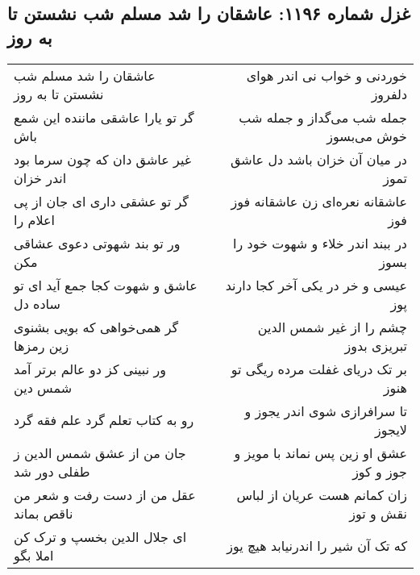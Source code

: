\begin{center}
\section*{غزل شماره ۱۱۹۶: عاشقان را شد مسلم شب نشستن تا به روز}
\label{sec:1196}
\begin{longtable}{l p{0.5cm} r}
عاشقان را شد مسلم شب نشستن تا به روز
&&
خوردنی و خواب نی اندر هوای دلفروز
\\
گر تو یارا عاشقی ماننده این شمع باش
&&
جمله شب می‌گداز و جمله شب خوش می‌بسوز
\\
غیر عاشق دان که چون سرما بود اندر خزان
&&
در میان آن خزان باشد دل عاشق تموز
\\
گر تو عشقی داری ای جان از پی اعلام را
&&
عاشقانه نعره‌ای زن عاشقانه فوز فوز
\\
ور تو بند شهوتی دعوی عشاقی مکن
&&
در ببند اندر خلاء و شهوت خود را بسوز
\\
عاشق و شهوت کجا جمع آید ای تو ساده دل
&&
عیسی و خر در یکی آخر کجا دارند پوز
\\
گر همی‌خواهی که بویی بشنوی زین رمزها
&&
چشم را از غیر شمس الدین تبریزی بدوز
\\
ور نبینی کز دو عالم برتر آمد شمس دین
&&
بر تک دریای غفلت مرده ریگی تو هنوز
\\
رو به کتاب تعلم گرد علم فقه گرد
&&
تا سرافرازی شوی اندر یجوز و لایجوز
\\
جان من از عشق شمس الدین ز طفلی دور شد
&&
عشق او زین پس نماند با مویز و جوز و کوز
\\
عقل من از دست رفت و شعر من ناقص بماند
&&
زان کمانم هست عریان از لباس نقش و توز
\\
ای جلال الدین بخسپ و ترک کن املا بگو
&&
که تک آن شیر را اندرنیابد هیچ یوز
\\
\end{longtable}
\end{center}
